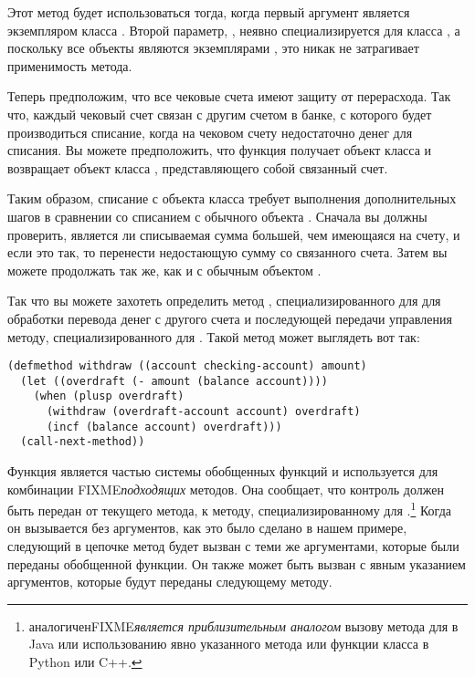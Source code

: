 Этот метод будет использоваться тогда, когда первый аргумент  является
экземпляром класса .  Второй параметр, , неявно
специализируется для класса , а поскольку все объекты являются экземплярами
, это никак не затрагивает применимость метода.

Теперь предположим, что все чековые счета имеют защиту от перерасхода.  Так что, каждый
чековый счет связан с другим счетом в банке, с которого будет производиться списание,
когда на чековом счету недостаточно денег для списания.  Вы можете предположить, что
функция  получает объект класса  и
возвращает объект класса , представляющего собой связанный счет.

Таким образом, списание с объекта класса  требует выполнения
дополнительных шагов в сравнении со списанием с обычного объекта .
Сначала вы должны проверить, является ли списываемая сумма большей, чем имеющаяся на
счету, и если это так, то перенести недостающую сумму со связанного счета.  Затем вы
можете продолжать так же, как и с обычным объектом .

Так что вы можете захотеть определить метод , специализированного для
 для обработки перевода денег с другого счета и последующей
передачи управления методу, специализированного для .  Такой метод
может выглядеть вот так:

\begin{lstlisting}
(defmethod withdraw ((account checking-account) amount)
  (let ((overdraft (- amount (balance account))))
    (when (plusp overdraft)
      (withdraw (overdraft-account account) overdraft)
      (incf (balance account) overdraft)))
  (call-next-method))
\end{lstlisting}

Функция  является частью системы обобщенных функций и используется
для комбинации FIXME\textit{подходящих} методов.  Она сообщает, что контроль должен быть
передан от текущего метода, к методу, специализированному для
.\footnote{ аналогиченFIXME\textit{является
    приблизительным аналогом} вызову метода для  в Java или использованию явно
  указанного метода или функции класса в Python или C++.}  Когда он вызывается без
аргументов, как это было сделано в нашем примере, следующий в цепочке метод будет вызван с
теми же аргументами, которые были переданы обобщенной функции.  Он также может быть вызван
с явным указанием аргументов, которые будут переданы следующему методу.

